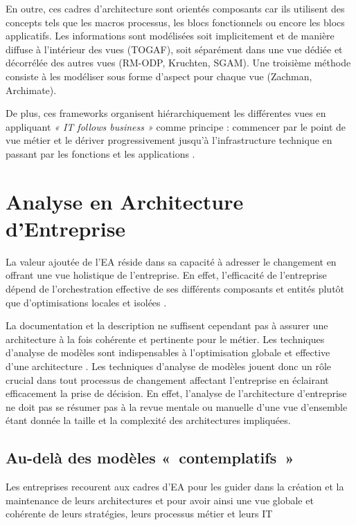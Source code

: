 En outre, ces cadres d'architecture sont orientés composants car ils utilisent 
des concepts tels que les macros processus, les blocs fonctionnels ou encore les 
blocs applicatifs. Les informations sont modélisées soit implicitement et de 
manière diffuse à l'intérieur des vues (TOGAF), soit séparément dans une vue 
dédiée et décorrélée des autres vues (RM-ODP, Kruchten, SGAM). Une troisième 
méthode consiste à les modéliser sous forme d'aspect pour chaque vue (Zachman, 
Archimate).

De plus, ces frameworks organisent hiérarchiquement les différentes vues en 
appliquant \emph{« IT follows business »} comme principe : commencer par le 
point de vue métier et le dériver progressivement jusqu'à l'infrastructure 
technique en passant par les fonctions et les applications 
\cite{winter2006essential}.


\section{Analyse en Architecture d'Entreprise}

La valeur ajoutée de l'EA réside dans sa capacité à adresser le changement en 
offrant une vue holistique de l'entreprise. En effet, l'efficacité de 
l'entreprise dépend de l'orchestration effective de ses différents composants 
et entités plutôt que d'optimisations locales et isolées 
\cite{nadler1992organizational}. 

La documentation et la description ne suffisent cependant pas à assurer une 
architecture à la fois cohérente et pertinente pour le métier. Les techniques 
d'analyse de modèles sont indispensables à l'optimisation globale et effective 
d'une architecture \cite{lankhorst2013enterprise}. Les techniques d'analyse de 
modèles jouent donc un rôle crucial dans tout processus de changement affectant 
l'entreprise en éclairant efficacement la prise de décision. En effet, l'analyse 
de l'architecture d'entreprise ne doit pas se résumer pas à la revue mentale ou 
manuelle d'une vue d'ensemble étant donnée la taille et la complexité des 
architectures impliquées.

	\subsection{Au-delà des modèles «~contemplatifs~»}

Les entreprises recourent aux cadres d'EA pour les guider dans la création et la 
maintenance de leurs architectures et pour avoir ainsi une vue globale et 
cohérente de leurs stratégies, leurs processus métier et leurs IT 

